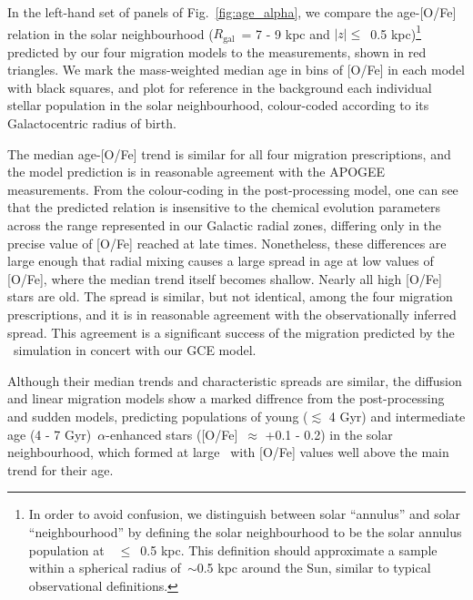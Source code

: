 \documentclass[draft2.tex]{subfiles}
\begin{document}
In the left-hand set of panels of Fig.~\ref{fig:age_alpha}, we compare the 
age-[O/Fe] relation in the solar neighbourhood ($R_\text{gal}$~= 7 - 9 kpc and 
$\left|z\right|\leq$~0.5 kpc)\footnote{
	In order to avoid confusion, we distinguish between solar ``annulus'' and 
	solar ``neighbourhood'' by defining the solar neighbourhood to be the 
	solar annulus population at~\absz~$\leq$~0.5 kpc. This definition should 
	approximate a sample within a spherical radius of~$\sim$0.5 kpc around the 
	Sun, similar to typical observational definitions. 
} predicted by our four migration models to the 
\citet{Feuillet2019} measurements, shown in red triangles. 
We mark the mass-weighted median age in bins of [O/Fe] in each model with black 
squares, and plot for reference in the background each individual stellar 
population in the solar neighbourhood, colour-coded according to its 
Galactocentric radius of birth. 
\par 
The median age-[O/Fe] trend is similar for all four migration prescriptions, 
and the model prediction is in reasonable agreement with the APOGEE 
measurements. 
From the colour-coding in the post-processing model, one can see that the 
predicted relation is insensitive to the chemical evolution parameters across 
the range represented in our Galactic radial zones, differing only in the 
precise value of [O/Fe] reached at late times. 
Nonetheless, these differences are large enough that radial mixing causes a 
large spread in age at low values of [O/Fe], where the median trend itself 
becomes shallow. 
Nearly all high [O/Fe] stars are old. 
The spread is similar, but not identical, among the four migration 
prescriptions, and it is in reasonable agreement with the observationally 
inferred spread. 
This agreement is a significant success of the migration predicted by the
\hsim~simulation in concert with our GCE model. 
\par 
Although their median trends and characteristic spreads are similar, the 
diffusion and linear migration models show a marked diffrence from the 
post-processing and sudden models, predicting populations of young 
($\lesssim$ 4 Gyr) and intermediate age (4 - 7 Gyr)~$\alpha$-enhanced stars 
([O/Fe]~$\approx$ +0.1 - 0.2) in the solar neighbourhood, which formed at large 
\rgal~with [O/Fe] values well above the main trend for their age. 
\end{document}
